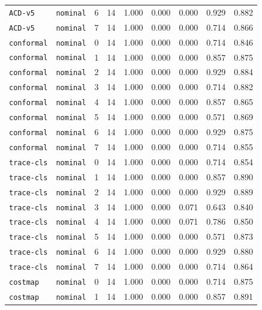 \documentclass{article}
\begin{document}
\begin{center}
{\begin{tabular}{llllccccc}
\texttt{ACD-v5} & \texttt{nominal} & 6 & 14 & 1.000 & 0.000 & 0.000 & 0.929 & 0.882 \\
\texttt{ACD-v5} & \texttt{nominal} & 7 & 14 & 1.000 & 0.000 & 0.000 & 0.714 & 0.866 \\
\texttt{conformal} & \texttt{nominal} & 0 & 14 & 1.000 & 0.000 & 0.000 & 0.714 & 0.846 \\
\texttt{conformal} & \texttt{nominal} & 1 & 14 & 1.000 & 0.000 & 0.000 & 0.857 & 0.875 \\
\texttt{conformal} & \texttt{nominal} & 2 & 14 & 1.000 & 0.000 & 0.000 & 0.929 & 0.884 \\
\texttt{conformal} & \texttt{nominal} & 3 & 14 & 1.000 & 0.000 & 0.000 & 0.714 & 0.882 \\
\texttt{conformal} & \texttt{nominal} & 4 & 14 & 1.000 & 0.000 & 0.000 & 0.857 & 0.865 \\
\texttt{conformal} & \texttt{nominal} & 5 & 14 & 1.000 & 0.000 & 0.000 & 0.571 & 0.869 \\
\texttt{conformal} & \texttt{nominal} & 6 & 14 & 1.000 & 0.000 & 0.000 & 0.929 & 0.875 \\
\texttt{conformal} & \texttt{nominal} & 7 & 14 & 1.000 & 0.000 & 0.000 & 0.714 & 0.855 \\
\texttt{trace-cls} & \texttt{nominal} & 0 & 14 & 1.000 & 0.000 & 0.000 & 0.714 & 0.854 \\
\texttt{trace-cls} & \texttt{nominal} & 1 & 14 & 1.000 & 0.000 & 0.000 & 0.857 & 0.890 \\
\texttt{trace-cls} & \texttt{nominal} & 2 & 14 & 1.000 & 0.000 & 0.000 & 0.929 & 0.889 \\
\texttt{trace-cls} & \texttt{nominal} & 3 & 14 & 1.000 & 0.000 & 0.071 & 0.643 & 0.840 \\
\texttt{trace-cls} & \texttt{nominal} & 4 & 14 & 1.000 & 0.000 & 0.071 & 0.786 & 0.850 \\
\texttt{trace-cls} & \texttt{nominal} & 5 & 14 & 1.000 & 0.000 & 0.000 & 0.571 & 0.873 \\
\texttt{trace-cls} & \texttt{nominal} & 6 & 14 & 1.000 & 0.000 & 0.000 & 0.929 & 0.880 \\
\texttt{trace-cls} & \texttt{nominal} & 7 & 14 & 1.000 & 0.000 & 0.000 & 0.714 & 0.864 \\
\texttt{costmap} & \texttt{nominal} & 0 & 14 & 1.000 & 0.000 & 0.000 & 0.714 & 0.875 \\
\texttt{costmap} & \texttt{nominal} & 1 & 14 & 1.000 & 0.000 & 0.000 & 0.857 & 0.891 \\
\bottomrule
\end{tabular}%
}
\end{center}
\end{document}

